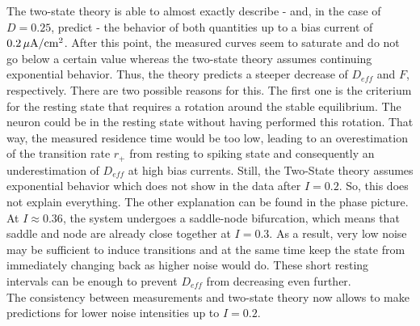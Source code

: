\documentclass[12pt,a4paper]{article}
\begin{document}
The two-state theory is able to almost exactly describe - and, in the case of $D=0.25$, predict - the behavior of both quantities up to a bias current of $\unit[0.2]{\mu A/\text{cm}^2}$. After this point, the measured curves seem to saturate and do not go below a certain value whereas the two-state theory assumes continuing exponential behavior. Thus, the theory predicts a steeper decrease of $D_{eff}$ and $F$, respectively. There are two possible reasons for this. The first one is the criterium for the resting state that requires a rotation around the stable equilibrium. The neuron could be in the resting state without having performed this rotation. That way, the measured residence time would be too low, leading to an overestimation of the transition rate $r_+$ from resting to spiking state and consequently an underestimation of $D_{eff}$ at high bias currents. Still, the Two-State theory assumes exponential behavior which does not show in the data after $I=0.2$. So, this does not explain everything. The other explanation can be found in the phase picture. At $I\approx 0.36$, the system undergoes a saddle-node bifurcation, which means that saddle and node are already close together at $I=0.3$. As a result, very low noise may be sufficient to induce transitions and at the same time keep the state from immediately changing back as higher noise would do. These short resting intervals can be enough to prevent $D_{eff}$ from decreasing even further.
\\
The consistency between measurements and two-state theory
now allows to make predictions for lower noise intensities up to $I=0.2$.
\end{document}
